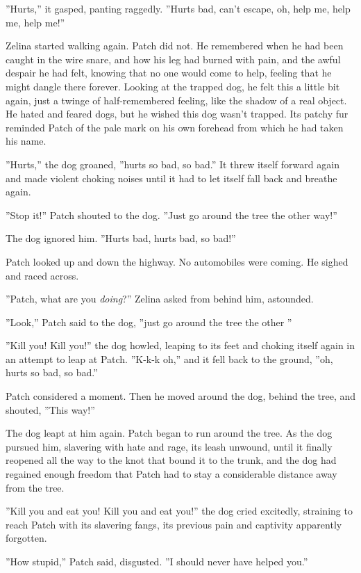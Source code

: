 \documentclass[12pt]{book}
\begin{document}
''Hurts,'' it gasped, panting raggedly. ''Hurts bad, can't escape, oh, help me, help me, help me!''

Zelina started walking again. Patch did not. He remembered when he had been caught in the wire snare, and how his leg had burned with pain, and the awful despair he had felt, knowing that no one would come to help, feeling that he might dangle there forever. Looking at the trapped dog, he felt this a little bit again, just a twinge of half-remembered feeling, like the shadow of a real object. He hated and feared dogs, but he wished this dog wasn't trapped. Its patchy fur reminded Patch of the pale mark on his own forehead from which he had taken his name.

''Hurts,'' the dog groaned, ''hurts so bad, so bad.'' It threw itself forward again and made violent choking noises until it had to let itself fall back and breathe again.

''Stop it!'' Patch shouted to the dog. ''Just go around the tree the other way!''

The dog ignored him. ''Hurts bad, hurts bad, so bad!''

Patch looked up and down the highway. No automobiles were coming. He sighed and raced across.

''Patch, what are you {\it doing}?'' Zelina asked from behind him, astounded.

''Look,'' Patch said to the dog, ''just go around the tree the other %
''

''Kill you! Kill you!'' the dog howled, leaping to its feet and choking itself again in an attempt to leap at Patch. ''K-k-k%
oh,'' and it fell back to the ground, ''oh, hurts so bad, so bad.''

Patch considered a moment. Then he moved around the dog, behind the tree, and shouted, ''This way!''

The dog leapt at him again. Patch began to run around the tree. As the dog pursued him, slavering with hate and rage, its leash unwound, until it finally reopened all the way to the knot that bound it to the trunk, and the dog had regained enough freedom that Patch had to stay a considerable distance away from the tree.

''Kill you and eat you! Kill you and eat you!'' the dog cried excitedly, straining to reach Patch with its slavering fangs, its previous pain and captivity apparently forgotten.

''How stupid,'' Patch said, disgusted. ''I should never have helped you.''
\end{document}
